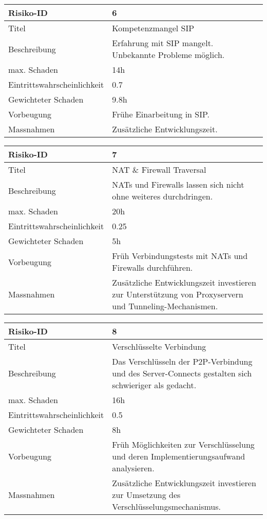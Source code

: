 	
\noindent
\begin{tabular}{|p{} | p{} |}
	\hline	
	Risiko-ID & 6 \\
	\hline
	Titel & Kompetenzmangel SIP \\
	Beschreibung & Erfahrung mit SIP mangelt. Unbekannte Probleme möglich. \\
	max. Schaden	& 14h \\
	Eintrittswahrscheinlichkeit & 0.7 \\
	Gewichteter Schaden	& 9.8h \\
	Vorbeugung	& Frühe Einarbeitung in SIP. \\
	Massnahmen	& Zusätzliche Entwicklungszeit. \\
	\hline
\end{tabular}
\hspace{0.5cm}
\newline


\noindent
\begin{tabular}{|p{} | p{} |}
	\hline	
	Risiko-ID & 7 \\
	\hline
	Titel & NAT \& Firewall Traversal \\
	Beschreibung & NATs und Firewalls lassen sich nicht ohne weiteres durchdringen.
	\\
	max. Schaden	& 20h \\
	Eintrittswahrscheinlichkeit & 0.25 \\
	Gewichteter Schaden	& 5h \\
	Vorbeugung	& Früh Verbindungstests mit NATs und Firewalls durchführen. \\
	Massnahmen	& Zusätzliche Entwicklungszeit investieren zur Unterstützung von
	Proxyservern und Tunneling-Mechanismen. \\
	\hline
\end{tabular}
\hspace{0.5cm}
\newline


\noindent
\begin{tabular}{|p{} | p{} |}
	\hline	
	Risiko-ID & 8 \\
	\hline
	Titel & Verschlüsselte Verbindung \\
	Beschreibung & Das Verschlüsseln der P2P-Verbindung und des Server-Connects
	gestalten sich schwieriger als gedacht. \\
	max. Schaden	& 16h \\
	Eintrittswahrscheinlichkeit & 0.5 \\
	Gewichteter Schaden	& 8h \\
	Vorbeugung	& Früh Möglichkeiten zur Verschlüsselung und deren
	Implementierungsaufwand analysieren. \\
	Massnahmen	& Zusätzliche Entwicklungszeit investieren zur Umsetzung des
	Verschlüsselungsmechanismus. \\
	\hline
\end{tabular}
\hspace{0.5cm}
\newline


